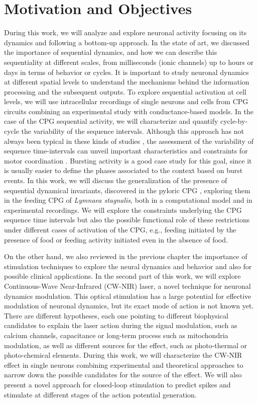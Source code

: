 \chapter{Motivation and Objectives}\label{c-review}
During this work, we will analyze and explore neuronal activity focusing on its dynamics and following a bottom-up approach. In the state of art, we discussed the importance of sequential dynamics, and how we can describe this sequentiality at different scales, from milliseconds (ionic channels) up to hours or days in terms of behavior or cycles. It is important to study neuronal dynamics at different spatial levels to understand the mechanisms behind the information processing and the subsequent outputs. To explore sequential activation at cell levels, we will use intracellular recordings of single neurons and cells from CPG circuits combining an experimental study with conductance-based models. In the case of the CPG sequential activity, we will characterize and quantify cycle-by-cycle the variability of the sequence intervals. Although this approach has not always been typical in these kinds of studies \parencite{anwar_interanimal_2022}, the assessment of the variability of sequence time-intervals can unveil important characteristics and constraints for motor coordination \parencite{elices_robust_2019}. Bursting activity is a good case study for this goal, since it is usually easier to define the phases associated to the context based on burst events. In this work, we will discuss the generalization of the presence of sequential dynamical invariants, discovered in the pyloric CPG \parencite{elices_robust_2019}, exploring them in the feeding CPG of \textit{Lymnaea stagnalis}, both in a computational model and in experimental recordings. We will explore the constraints underlying the CPG sequence time intervals but also the possible functional role of these restrictions under different cases of activation of the CPG, e.g., feeding initiated by the presence of food or feeding activity initiated even in the absence of food. 

On the other hand, we also reviewed in the previous chapter the importance of stimulation techniques to explore the neural dynamics and behavior and also for possible clinical applications. In the second part of this work, we will explore Continuous-Wave Near-Infrared (CW-NIR) laser, a novel technique for neuronal dynamics modulation. This optical stimulation has a 
 large potential for effective modulation of neuronal dynamics, but its exact mode of action is not known yet. There are different hypotheses, each one pointing to different biophysical candidates to explain the laser action  during the signal modulation, such as calcium channels, capacitance or long-term process such as mitochondria modulation, as well as different sources for the effect, such as photo-thermal or photo-chemical elements. During this work, we will characterize the CW-NIR effect in single neurons combining experimental and theoretical approaches to narrow down the possible candidates for the source of the effect. We will also present a novel approach for closed-loop stimulation to predict spikes and stimulate at different stages of the action potential generation. 


